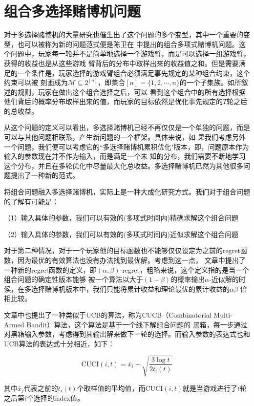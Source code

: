 \documentclass[bachelor]{thuthesis}
\begin{document}
\section{组合多选择赌博机问题}

对于多选择赌博机的大量研究也催生出了这个问题的多个变型，其中一个重要的变型，也可以被称为新的问题范式便是陈卫在
\cite{cmab}
中提出的组合多项式赌博机问题。这个问题中，玩家每一轮并不是简单地选择一个游戏臂，而是可以选择一组游戏臂，获得的收益也是从这些游戏
臂背后的分布中取样出来的收益值之和。但是需要满足的一个条件是，玩家选择的游戏臂组合必须满足事先规定的某种组合约束，这个约束可以被
刻画成为$\mathcal{M}\subseteq 2^{[n]}$，即集合$[n]=\{1,2,\cdots,n\}$的一个子集族。如所叙述的规则，玩家在做出这个组合选择之后，可以
看到这个组合中的所有选择根据他们背后的概率分布取样出来的值，而玩家的目标依然是优化事先规定的$T$轮之后的总收益。

从这个问题的定义可以看出，多选择赌博机已经不再仅仅是一个单独的问题，而是可以与其他问题相联系，产生新问题的一个框架。具体来说，如
果我们考虑另外一个问题，我们便可以考虑它的``多选择赌博机累积优化"版本，即，问题原本作为输入的参数现在并不作为输入，而是满足一个未
知的分布，我们需要不断地学习这个分布，并且在多轮优化中尽量最大化总收益。多选择赌博机已然为其他很多问题提出了一种新的范式。

将组合问题融入多选择赌博机，实际上是一种大成化研究方式。我们对于组合问题的了解有可能是：

（1）输入具体的参数，我们可以有效的(多项式时间内)精确求解这个组合问题

（2）输入具体的参数，我们可以有效的(多项式时间内)近似求解这个组合问题

对于第二种情况，对于一个玩家他的目标函数也不能够仅仅设定为之前的regret函数，因为最优的有效算法也没有办法找到最优解。考虑到这一点，
文章\cite{cmab}中提出了一种新的regret函数的定义，即$(\alpha,\beta)$-regret，粗略来说，这个定义指的是当一个组合问题的确定性版本能够
被一个算法以大于$(1-\beta)$的概率输出$\alpha$-近似解的时候，在多选择赌博机版本中，我们只能将累计收益和理论最优的累计收益的$\alpha\beta$
倍相比较。

文章\cite{cmab}中也提出了一种类似于UCB的算法，称为CUCB（Combinatorial Multi-Armed Bandit）算法，这个算法是基于一个线下解组合问题的
黑箱，每一步通过对黑箱输入参数，考虑得到其输出解来做下一轮的选择。而输入参数的表达式也和UCB算法的表达式十分相近，如下：

\[\text{CUCI}(i,t)=\bar{x}_i+\sqrt{\frac{3\log t}{2t_i(t)}}\]

其中$\bar{x}_j$代表之前的$t_i(t)$个取样值的平均值，而$\text{CUCI}(i,t)$就是当游戏进行了$t$轮之后第$i$个选择的index值。
\end{document}
